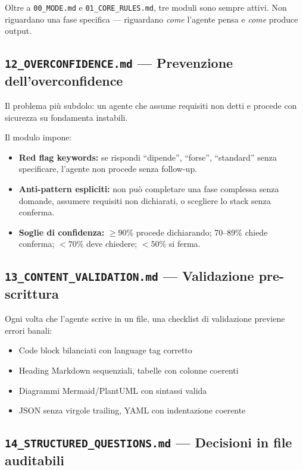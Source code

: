 Oltre a \texttt{00\_MODE.md} e \texttt{01\_CORE\_RULES.md}, tre moduli sono sempre attivi. Non riguardano una fase specifica --- riguardano \emph{come} l'agente pensa e \emph{come} produce output.

\subsection*{\texttt{12\_OVERCONFIDENCE.md} --- Prevenzione dell'overconfidence}

Il problema più subdolo: un agente che assume requisiti non detti e procede con sicurezza su fondamenta instabili.

Il modulo impone:
\begin{itemize}
  \item \textbf{Red flag keywords:} se rispondi ``dipende'', ``forse'', ``standard'' senza specificare, l'agente non procede senza follow-up.
  \item \textbf{Anti-pattern espliciti:} non può completare una fase complessa senza domande, assumere requisiti non dichiarati, o scegliere lo stack senza conferma.
  \item \textbf{Soglie di confidenza:} $\geq 90\%$ procede dichiarando; 70--89\% chiede conferma; $< 70\%$ deve chiedere; $< 50\%$ si ferma.
\end{itemize}

\subsection*{\texttt{13\_CONTENT\_VALIDATION.md} --- Validazione pre-scrittura}

Ogni volta che l'agente scrive in un file, una checklist di validazione previene errori banali:
\begin{itemize}
  \item Code block bilanciati con language tag corretto
  \item Heading Markdown sequenziali, tabelle con colonne coerenti
  \item Diagrammi Mermaid/PlantUML con sintassi valida
  \item JSON senza virgole trailing, YAML con indentazione coerente
\end{itemize}

\subsection*{\texttt{14\_STRUCTURED\_QUESTIONS.md} --- Decisioni in file auditabili}

